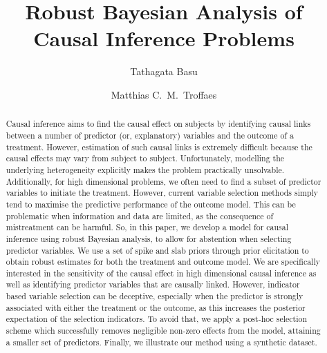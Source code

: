 \documentclass[preprint,12pt]{elsarticle}
\begin{document}
\begin{frontmatter}

\title{Robust Bayesian Analysis of Causal Inference Problems}
\author[1]{Tathagata Basu}
\author[2]{Matthias C.~M.~Troffaes}

\begin{abstract}
Causal inference aims to find the causal effect on subjects
by identifying causal links between
a number of predictor (or, explanatory) variables and the outcome of a treatment.
However, estimation of such causal links is extremely 
difficult because the causal effects may vary from subject 
to subject. Unfortunately, modelling the underlying heterogeneity explicitly makes the 
problem practically unsolvable. Additionally, for high dimensional problems,
we often need to find a subset of 
predictor variables to initiate the treatment. However, current variable selection methods
simply tend to maximise the predictive performance of the outcome model. This can be problematic when information and data are limited,
as the consequence of mistreatment can be harmful. 
So, in this paper, we develop a model for causal inference using
robust Bayesian analysis, to allow for abstention when selecting
predictor variables.
We
use a set of spike and slab priors 
through prior elicitation to obtain robust estimates for
both the treatment and outcome model. We are specifically interested 
in the sensitivity of the causal effect in high dimensional causal inference
as well as identifying predictor variables that are causally linked. However, indicator
based variable selection can be deceptive, especially
when the predictor is strongly associated with either the treatment or 
the outcome, as this increases the posterior expectation of the selection
indicators. To avoid that, we apply a post-hoc selection scheme
which successfully removes negligible non-zero effects from the model,
attaining a smaller set of 
predictors.
Finally, we illustrate
our method using a synthetic dataset.
\end{abstract}


\end{frontmatter}
\end{document}
